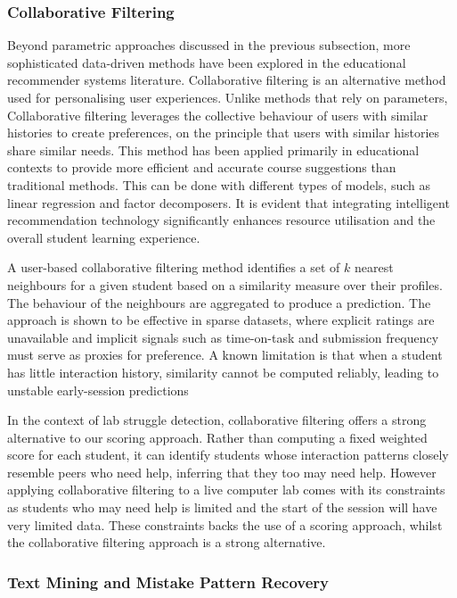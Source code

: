 \subsubsection{Collaborative Filtering}

Beyond parametric approaches discussed in the previous subsection, more sophisticated data-driven methods have been explored in the educational recommender systems literature.
Collaborative filtering is an alternative method used for personalising user experiences.
Unlike methods that rely on parameters, Collaborative filtering leverages the collective behaviour of users with similar histories to create preferences, on the principle that users with similar histories share similar needs. This method has been applied primarily in educational contexts to provide more efficient and accurate course suggestions than traditional methods. This can be done with different types of models, such as linear regression and factor decomposers. It is evident that integrating intelligent recommendation technology significantly enhances resource utilisation and the overall student learning experience.

A user-based collaborative filtering method identifies a set of $k$ nearest neighbours for a given student based on a similarity measure over their profiles. The behaviour of the neighbours are aggregated to produce a prediction. The approach is shown to be effective in sparse datasets, where explicit ratings are unavailable and implicit signals such as time-on-task and submission frequency must serve as proxies for preference. A known limitation is that when a student has little interaction history, similarity cannot be computed reliably, leading to unstable early-session predictions  

In the context of lab struggle detection, collaborative filtering offers a strong alternative to our scoring approach. Rather than computing a fixed weighted score for each student, it can identify students whose interaction patterns closely resemble peers who need help, inferring that they too may need help. However applying collaborative filtering to a live computer lab comes with its constraints as students who may need help is limited and the start of the session will have very limited data. These constraints backs the use of a scoring approach, whilst the collaborative filtering approach is a strong alternative.


\subsubsection{Text Mining and Mistake Pattern Recovery}

